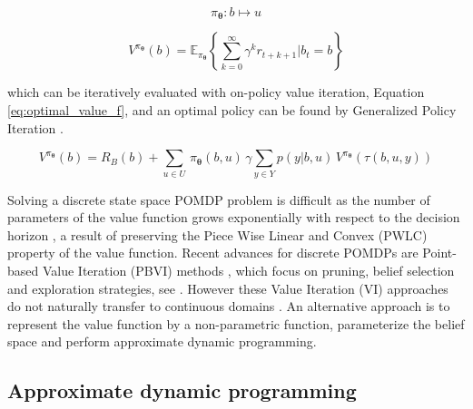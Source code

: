 \documentclass[final,5p,times,twocolumn]{elsarticle}
\newcommand{\Param}{\boldsymbol{\theta}}
\begin{document}
\begin{equation}\label{eq:policy}
  \pi_{\Param} : b \mapsto u
\end{equation}

\begin{equation}\label{eq:expected_reward_back}
 V^{\pi_{\Param}}(b) = \mathbb{E}_{\pi_{\Param}} \left\{  \sum^{\infty}_{k=0} \gamma^k r_{t+k+1} \Bigg\lvert b_t = b \right\}
\end{equation}

which can be iteratively evaluated with on-policy value iteration, Equation \ref{eq:optimal_value_f}, and an optimal policy can be found 
by Generalized Policy Iteration \cite[Chap. 4.6]{sutton1998reinforcement}.

\begin{equation} \label{eq:optimal_value_f}
  V^{\pi_{\Param}}(b) = R_B(b) + \sum\limits_{u \in U}\, \pi_{\Param}(b,u)\, \gamma \sum\limits_{y\in Y} p(y|b,u)\, V^{\pi_{\Param}}(\tau(b,u,y))
\end{equation}

Solving a discrete state space POMDP problem is difficult as the number of parameters 
of the value function grows exponentially with respect to the decision horizon \cite[Chap. 15]{Thrun_Burgard_Fox_2005}\cite{Sondik_1973},
a result of preserving the Piece Wise Linear and Convex (PWLC) property of the value function. Recent 
advances for discrete POMDPs are Point-based Value Iteration (PBVI) methods \cite{PBVI_2003}, which focus
on pruning, belief selection and exploration strategies, see \cite{Veiga14aaai,POMDP_approach_2010}.
However these Value Iteration (VI) approaches do not naturally transfer to 
continuous domains \cite{cPBVI_2006}. An alternative approach is to represent the value function by a non-parametric function,
parameterize the belief space and perform approximate dynamic programming.


\subsection{Approximate dynamic programming}

%

%
\end{document}
